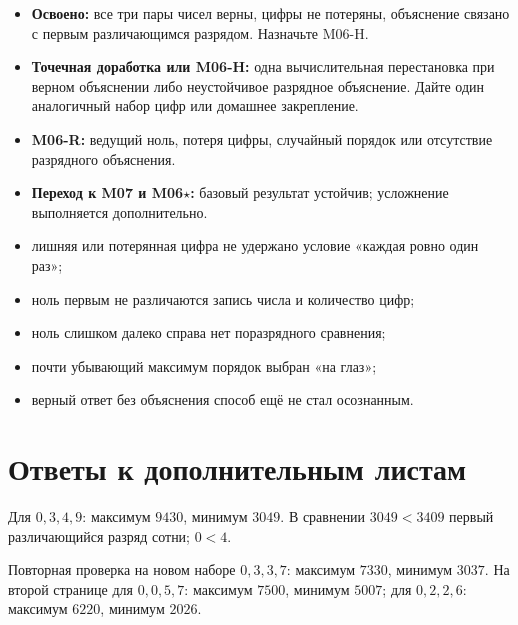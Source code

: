 \begin{resultbox}
  \begin{itemize}
    \item \textbf{Освоено:} все три пары чисел верны, цифры не потеряны,
      объяснение связано с первым различающимся разрядом. Назначьте M06-H.
    \item \textbf{Точечная доработка или M06-H:} одна вычислительная
      перестановка при верном объяснении либо неустойчивое разрядное
      объяснение. Дайте один аналогичный набор цифр или домашнее закрепление.
    \item \textbf{M06-R:} ведущий ноль, потеря цифры, случайный порядок или
      отсутствие разрядного объяснения.
    \item \textbf{Переход к M07 и M06\(\star\):} базовый результат устойчив;
      усложнение выполняется дополнительно.
  \end{itemize}
\end{resultbox}

\begin{teacherbox}
  \begin{itemize}
    \item лишняя или потерянная цифра \textemdash{} не удержано условие «каждая ровно
      один раз»;
    \item ноль первым \textemdash{} не различаются запись числа и количество цифр;
    \item ноль слишком далеко справа \textemdash{} нет поразрядного сравнения;
    \item почти убывающий максимум \textemdash{} порядок выбран «на глаз»;
    \item верный ответ без объяснения \textemdash{} способ ещё не стал осознанным.
  \end{itemize}
\end{teacherbox}

\newpage
\section{Ответы к дополнительным листам}

\begin{teacherbox}[M06-R]
  Для \(0,3,4,9\): максимум \(9430\), минимум \(3049\). В сравнении
  \(3049<3409\) первый различающийся разряд \textemdash{} сотни; \(0<4\).

  Повторная проверка на новом наборе \(0,3,3,7\): максимум \(7330\), минимум
  \(3037\). На второй странице для \(0,0,5,7\): максимум \(7500\), минимум
  \(5007\); для \(0,2,2,6\): максимум \(6220\), минимум \(2026\).
\end{teacherbox}

